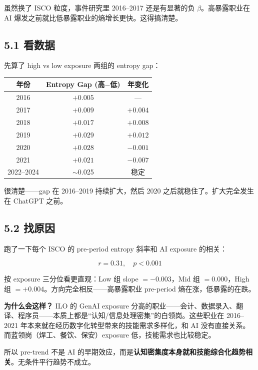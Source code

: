 \documentclass[12pt,a4paper]{article}
\begin{document}
虽然换了 ISCO 粒度，事件研究里 2016--2017 还是有显著的负 $\beta$。高暴露职业在 AI 爆发之前就比低暴露职业的熵增长更快。这得搞清楚。

\subsection*{5.1 看数据}

先算了 high vs low exposure 两组的 entropy gap：

\begin{center}
\small
\begin{tabular}{ccc}
\toprule
年份 & Entropy Gap (高$-$低) & 年变化 \\
\midrule
2016 & $+0.005$ & --- \\
2017 & $+0.009$ & $+0.004$ \\
2018 & $+0.017$ & $+0.008$ \\
2019 & $+0.029$ & $+0.012$ \\
2020 & $+0.028$ & $-0.001$ \\
2021 & $+0.021$ & $-0.007$ \\
2022--2024 & $\sim$0.025 & 稳定 \\
\bottomrule
\end{tabular}
\end{center}

很清楚——gap 在 2016--2019 持续扩大，然后 2020 之后就稳住了。扩大完全发生在 ChatGPT 之前。

\subsection*{5.2 找原因}

跑了一下每个 ISCO 的 pre-period entropy 斜率和 AI exposure 的相关：

$$r = 0.31,\quad p < 0.001$$

按 exposure 三分位看更直观：Low 组 slope $= -0.003$，Mid 组 $= 0.000$，High 组 $= +0.004$。方向完全相反——高暴露职业 pre-period 熵在涨，低暴露的在跌。

\textbf{为什么会这样？} ILO 的 GenAI exposure 分高的职业——会计、数据录入、翻译、程序员——本质上都是“认知/信息处理密集”的白领岗。这些职业在 2016--2021 年本来就在经历数字化转型带来的技能需求多样化，和 AI 没有直接关系。而蓝领岗（焊工、餐饮、保安）exposure 低，技能需求也比较稳定。

所以 pre-trend 不是 AI 的早期效应，而是\textbf{认知密集度本身就和技能综合化趋势相关}。无条件平行趋势不成立。

\bigskip
\end{document}
